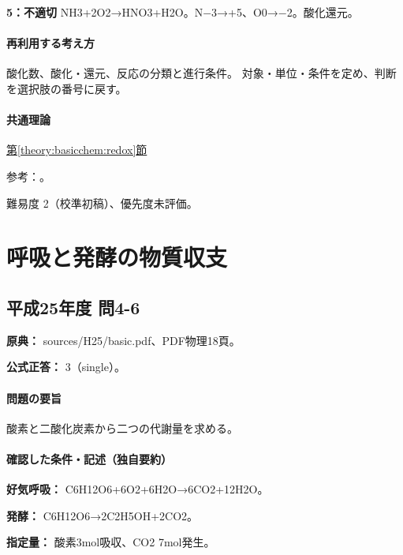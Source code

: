 \noindent\textbf{5：不適切} NH3+2O2→HNO3+H2O。N−3→+5、O0→−2。酸化還元。\par

\paragraph{再利用する考え方} 酸化数、酸化・還元、反応の分類と進行条件。 対象・単位・条件を定め、判断を選択肢の番号に戻す。

\paragraph{共通理論} \hyperref[theory:basicchem:redox]{第\ref*{theory:basicchem:redox}節}

\par 参考：\cite{iupac_oxidation_state}。

\par 難易度 2（校準初稿）、優先度未評価。

\section{呼吸と発酵の物質収支}

\subsection{平成25年度 問4-6}
\label{q:h25-reg-basic-4-6}

\noindent\textbf{原典：} sources/H25/basic.pdf、PDF物理18頁。

\textbf{公式正答：} 3（single）。

\paragraph{問題の要旨} 酸素と二酸化炭素から二つの代謝量を求める。

\paragraph{確認した条件・記述（独自要約）}\mbox{}\par

\noindent\textbf{好気呼吸：} C6H12O6+6O2+6H2O→6CO2+12H2O。\par

\noindent\textbf{発酵：} C6H12O6→2C2H5OH+2CO2。\par

\noindent\textbf{指定量：} 酸素3mol吸収、CO2 7mol発生。\par

